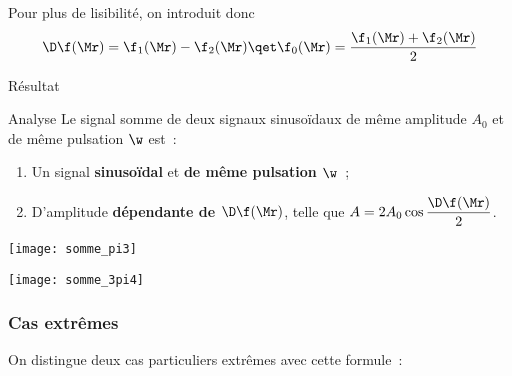 \documentclass[../main/main.tex]{subfiles}
\begin{document}
Pour plus de lisibilité, on introduit donc
\[
    \D\f(\Mr) = \f_1(\Mr) - \f_2(\Mr)
    \qet
    \f_0(\Mr) = \frac{\f_1(\Mr)+\f_2(\Mr)}{2}
\]
\begin{bprop}{Résultat}
    \vspace{-15pt}
\end{bprop}
\begin{bror}{Analyse}
    Le signal somme de deux signaux sinusoïdaux de même amplitude $A_0$ et de
    même pulsation $\w$ est~:
    \begin{enumerate}
        \item Un signal \textbf{sinusoïdal} et \textbf{de même pulsation
            $\mathbf{\w}$}~;
        \item D'amplitude \textbf{dépendante de $\mathbf{\D\f(\Mr)}$}, telle que
            $A = 2A_0\cos\dfrac{\D\f(\Mr)}{2}$.
    \end{enumerate}

    \begin{minipage}{0.45\linewidth}
        \begin{center}
            \texttt{[image: somme\_pi3]}
            \label{fig:sommepi3}
        \end{center}
    \end{minipage}
    \hfill
    \begin{minipage}{0.45\linewidth}
        \begin{center}
            \texttt{[image: somme\_3pi4]}
            \label{fig:somme3pi4}
        \end{center}
    \end{minipage}
\end{bror}

\vspace{-10pt}
\subsubsection{Cas extrêmes}
On distingue deux cas particuliers extrêmes avec cette formule~:
\end{document}
